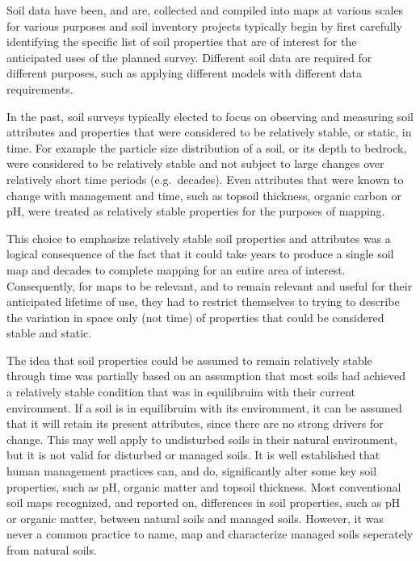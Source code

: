 \documentclass[11pt]{krantz}
\theoremstyle{definition}
\theoremstyle{definition}
\theoremstyle{definition}
\theoremstyle{remark}
\begin{document}
Soil data have been, and are, collected and compiled into maps at
various scales for various purposes and soil inventory projects
typically begin by first carefully identifying the specific list of soil
properties that are of interest for the anticipated uses of the planned
survey. Different soil data are required for different purposes, such as
applying different models with different data requirements.

In the past, soil surveys typically elected to focus on observing and
measuring soil attributes and properties that were considered to be
relatively stable, or static, in time. For example the particle size
distribution of a soil, or its depth to bedrock, were considered to be
relatively stable and not subject to large changes over relatively short
time periods (e.g.~decades). Even attributes that were known to change
with management and time, such as topsoil thickness, organic carbon or
pH, were treated as relatively stable properties for the purposes of
mapping.

This choice to emphasize relatively stable soil properties and
attributes was a logical consequence of the fact that it could take
years to produce a single soil map and decades to complete mapping for
an entire area of interest. Consequently, for maps to be relevant, and
to remain relevant and useful for their anticipated lifetime of use,
they had to restrict themselves to trying to describe the variation in
space only (not time) of properties that could be considered stable and
static.

The idea that soil properties could be assumed to remain relatively
stable through time was partially based on an assumption that most soils
had achieved a relatively stable condition that was in equilibruim with
their current environment. If a soil is in equilibruim with its
enviromment, it can be assumed that it will retain its present
attributes, since there are no strong drivers for change. This may well
apply to undisturbed soils in their natural environment, but it is not
valid for disturbed or managed soils. It is well established that human
management practices can, and do, significantly alter some key soil
properties, such as pH, organic matter and topsoil thickness. Most
conventional soil maps recognized, and reported on, differences in soil
properties, such as pH or organic matter, between natural soils and
managed soils. However, it was never a common practice to name, map and
characterize managed soils seperately from natural soils.
\end{document}

